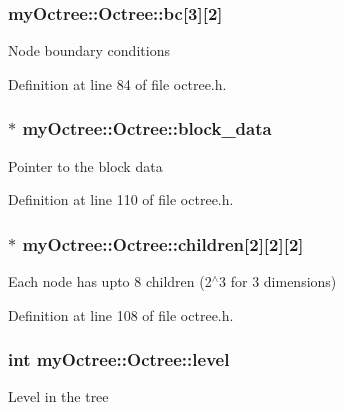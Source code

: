 \subsubsection[{bc}]{ my\+Octree\+::\+Octree\+::bc\mbox{[}3\mbox{]}\mbox{[}2\mbox{]}}\label{classmy_octree_1_1_octree_a5f1bf21928a132fd13eb4aed27d927f9}
Node boundary conditions 

Definition at line 84 of file octree.\+h.

\hypertarget{classmy_octree_1_1_octree_a9fb4c2bd32aa53ede33abc49aff9884a}{}
\subsubsection[{block\+\_\+data}]{$\ast$ my\+Octree\+::\+Octree\+::block\+\_\+data\hspace{0.3cm}{\ttfamily [private]}}\label{classmy_octree_1_1_octree_a9fb4c2bd32aa53ede33abc49aff9884a}
Pointer to the block data 

Definition at line 110 of file octree.\+h.

\hypertarget{classmy_octree_1_1_octree_a2600c7d4ed026f4566412ba67feba623}{}
\subsubsection[{children}]{$\ast$ my\+Octree\+::\+Octree\+::children\mbox{[}2\mbox{]}\mbox{[}2\mbox{]}\mbox{[}2\mbox{]}\hspace{0.3cm}{\ttfamily [private]}}\label{classmy_octree_1_1_octree_a2600c7d4ed026f4566412ba67feba623}
Each node has upto 8 children (2$^\wedge$3 for 3 dimensions) 

Definition at line 108 of file octree.\+h.

\hypertarget{classmy_octree_1_1_octree_a4f032a94e51ee90c4d97a3acfea9419d}{}
\subsubsection[{level}]{\setlength{\rightskip}{0pt plus 5cm}int my\+Octree\+::\+Octree\+::level\hspace{0.3cm}{\ttfamily [private]}}\label{classmy_octree_1_1_octree_a4f032a94e51ee90c4d97a3acfea9419d}
Level in the tree 

